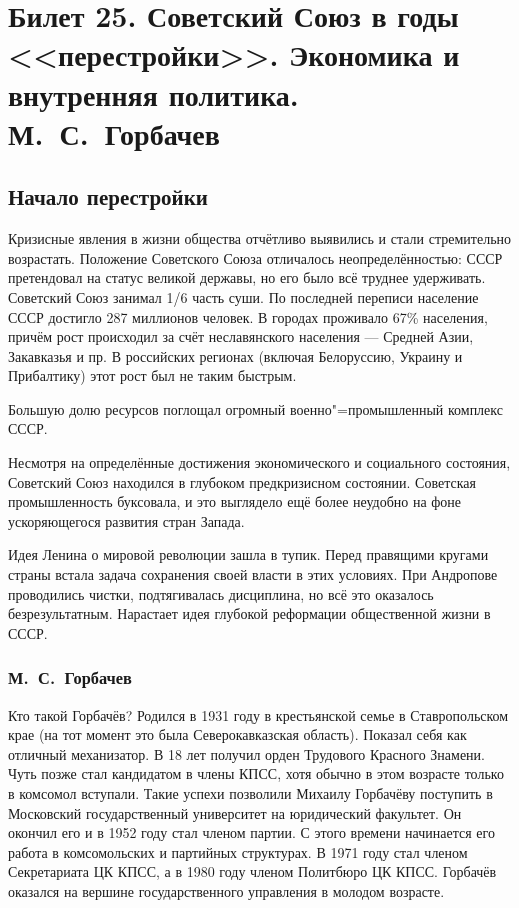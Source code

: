\section{Билет 25. Советский Союз в годы <<перестройки>>. Экономика и внутренняя политика. М.~С.~Горбачев}

\subsection{Начало перестройки}

Кризисные явления в жизни общества отчётливо выявились и стали стремительно возрастать. Положение Советского Союза отличалось неопределённостью: СССР претендовал на статус великой державы, но его было всё труднее удерживать. Советский Союз занимал 1/6 часть суши. По последней переписи население СССР достигло 287 миллионов человек. В городах проживало 67\% населения, причём рост происходил за счёт неславянского населения --- Средней Азии, Закавказья и пр. В российских регионах (включая Белоруссию, Украину и Прибалтику) этот рост был не таким быстрым.

Большую долю ресурсов поглощал огромный военно"=промышленный комплекс СССР.

Несмотря на определённые достижения экономического и социального состояния, Советский Союз находился в глубоком предкризисном состоянии. Советская промышленность буксовала, и это выглядело ещё более неудобно на фоне ускоряющегося развития стран Запада.

Идея Ленина о мировой революции зашла в тупик. Перед правящими кругами страны встала задача сохранения своей власти в этих условиях. При Андропове проводились чистки, подтягивалась дисциплина, но всё это оказалось безрезультатным. Нарастает идея глубокой реформации общественной жизни в СССР.

\subsubsection{\textbf{М.~С.~Горбачев}}

Кто такой Горбачёв? Родился в 1931 году в крестьянской семье в Ставропольском крае (на тот момент это была Северокавказская область). Показал себя как отличный механизатор. В 18 лет получил орден Трудового Красного Знамени. Чуть позже стал кандидатом в члены КПСС, хотя обычно в этом возрасте только в комсомол вступали. Такие успехи позволили Михаилу Горбачёву поступить в Московский государственный университет на юридический факультет. Он окончил его и в 1952 году стал членом партии. С этого времени начинается его работа в комсомольских и партийных структурах. В 1971 году стал членом Секретариата ЦК КПСС, а в 1980 году членом Политбюро ЦК КПСС. Горбачёв оказался на вершине государственного управления в молодом возрасте.

